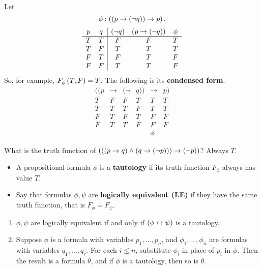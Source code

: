\begin{example2}
Let
$$ \phi : \left( \left( p \rightarrow \left( \neg q \right) \right) \rightarrow p \right). $$
$$
\begin{array}{cc|ccc}
p & q & \left( \neg q \right) & \left( p \rightarrow \left( \neg q \right) \right) & \phi \\
\hline
T & T & F & F & T \\
T & F & T & T & T \\
F & T & F & T & F \\
F & F & T & T & F
\end{array}
$$
So, for example, $ F_\phi\left( T, F \right) = T $. The following is its \textbf{condensed form}.
$$
\begin{array}{rcrlcl}
((p & \rightarrow & (\neg & q)) & \rightarrow & p) \\
\hline
T & F & F & T & T & T \\
T & T & T & F & T & T \\
F & T & F & T & F & F \\
F & T & T & F & F & F \\
& & & & \phi &
\end{array}
$$
\end{example2}


\begin{example2}
What is the truth function of $ \left( \left( \left( p \rightarrow q \right) \land \left( q \rightarrow \left( \neg p \right) \right) \right) \rightarrow \left( \neg p \right) \right) $? Always $ T $.
\end{example2}

\begin{definition}
\hfill
\begin{itemize}
\item A propositional formula $ \phi $ is a \textbf{tautology} if its truth function $ F_\phi $ always has value $ T $.
\item Say that formulas $ \phi, \psi $ are \textbf{logically equivalent (LE)} if they have the same truth function, that is $ F_\phi = F_\psi $.
\end{itemize}
\end{definition}

\begin{remark1}
\label{rem:1.1.5}
\hfill
\begin{enumerate}
\item $ \phi, \psi $ are logically equivalent if and only if $ \left( \phi \leftrightarrow \psi \right) $ is a tautology.
\item Suppose $ \phi $ is a formula with variables $ p_1, \dots, p_n $, and $ \phi_1, \dots, \phi_n $ are formulas with variables $ q_1, \dots, q_r $. For each $ i \le n $, substitute $ \phi_i $ in place of $ p_i $ in $ \phi $. Then the result is a formula $ \theta $, and if $ \phi $ is a tautology, then so is $ \theta $.
\end{enumerate}
\end{remark1}

